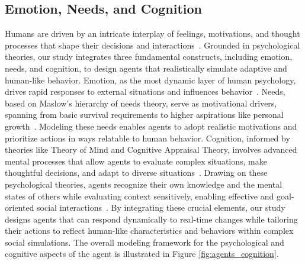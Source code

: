 


\subsection{Emotion, Needs, and Cognition} \label{sec:emotion}





Humans are driven by an intricate interplay of feelings, motivations, and thought processes that shape their decisions and interactions~\cite{shvo2019interdependent,al2023chatgpt}. Grounded in psychological theories, our study integrates three fundamental constructs, including emotion, needs, and cognition, to design agents that realistically simulate adaptive and human-like behavior. Emotion, as the most dynamic layer of human psychology, drives rapid responses to external situations and influences behavior~\cite{bourgais2018emotion,beall2017emotivational}. Needs, based on Maslow’s hierarchy of needs theory, serve as motivational drivers, spanning from basic survival requirements to higher aspirations like personal growth~\cite{acevedo2018personalistic}. Modeling these needs enables agents to adopt realistic motivations and prioritize actions in ways relatable to human behavior. 
Cognition, informed by theories like Theory of Mind and Cognitive Appraisal Theory, involves advanced mental processes that allow agents to evaluate complex situations, make thoughtful decisions, and adapt to diverse situations~\cite{bandura1989human, schurmann2020personalizing}. Drawing on these psychological theories,  agents recognize their own knowledge and the mental states of others while evaluating context sensitively, enabling effective and goal-oriented social interactions~\cite{pynadath2011modeling}.
By integrating these crucial elements, our study designs agents that can respond dynamically to real-time changes while tailoring their actions to reflect human-like characteristics and behaviors within complex social simulations. The overall modeling framework for the psychological and cognitive aspects of the agent is illustrated in Figure \ref{fig:agents_cognition}.

